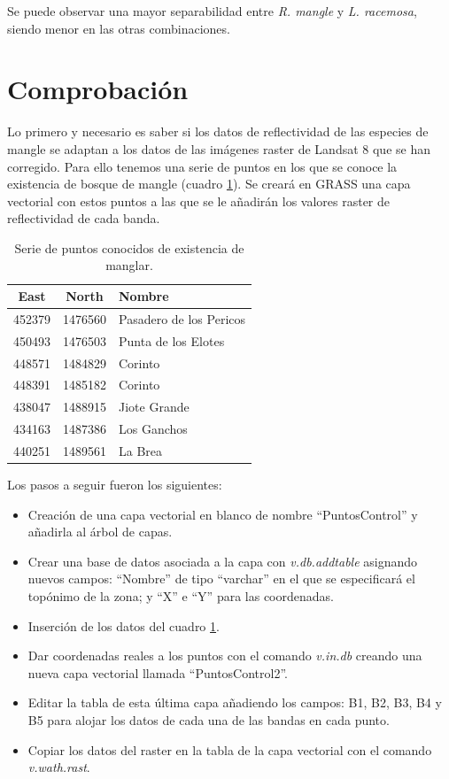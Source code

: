Se puede observar una mayor separabilidad entre \textit{R. mangle} y \textit{L. racemosa}, siendo menor en las otras combinaciones.

\section{Comprobación}
Lo primero y necesario es saber si los datos de reflectividad de las especies de mangle se adaptan a los datos de las imágenes raster de Landsat 8 que se han corregido. Para ello tenemos una serie de puntos en los que se conoce la existencia de bosque de mangle (cuadro \ref{tab:puntos}). Se creará en GRASS una capa vectorial con estos puntos a las que se le añadirán los valores raster de reflectividad de cada banda.\Sep

\begin{table}
	\centering
	\caption[Puntos de control]{Serie de puntos conocidos de existencia de manglar.}
	\begin{tabular}{@{}ccl@{}}
	\toprule[0.4mm]
	East & North & Nombre\\
	\midrule
	452379 & 1476560 & Pasadero de los Pericos\\
	450493 & 1476503 & Punta de los Elotes\\
	448571 & 1484829 & Corinto\\
	448391 & 1485182 & Corinto\\
	438047 & 1488915 & Jiote Grande\\
	434163 & 1487386 & Los Ganchos\\
	440251 & 1489561 & La Brea\\
	\bottomrule[0.4mm]
	\end{tabular}
	\label{tab:puntos}
\end{table}

Los pasos a seguir fueron los siguientes:

\begin{itemize}
	\item Creación de una capa vectorial en blanco de nombre ``PuntosControl'' y añadirla al árbol de capas.
	\item Crear una base de datos asociada a la capa con \textit{v.db.addtable} asignando nuevos campos: ``Nombre'' de tipo ``varchar'' en el que se especificará el topónimo de la zona; y ``X'' e ``Y'' para las coordenadas.
	\item Inserción de los datos del cuadro \ref{tab:puntos}.
	\item Dar coordenadas reales a los puntos con el comando \textit{v.in.db} creando una nueva capa vectorial llamada ``PuntosControl2''.
	\item Editar la tabla de esta última capa añadiendo los campos: B1, B2, B3, B4 y B5 para alojar los datos de cada una de las bandas en cada punto.
	\item Copiar los datos del raster en la tabla de la capa vectorial con el comando \textit{v.wath.rast}.
\end{itemize}

